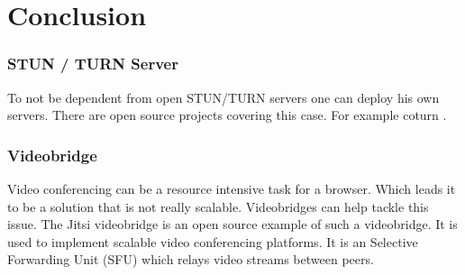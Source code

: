 \clearpage
\chapter{Conclusion}

\subsection{STUN / TURN Server}
To not be dependent from open STUN/TURN servers one can deploy his own servers. There are open source projects covering this case. For example coturn \cite{coturn}.

\subsection{Videobridge}
Video conferencing can be a resource intensive task for a browser. Which leads it to be a solution that is not really scalable. Videobridges can help tackle this issue. The Jitsi videobridge is an open source example of such a videobridge. It is used to implement scalable video conferencing platforms. It is an Selective Forwarding Unit (SFU) which relays video streams between peers.
